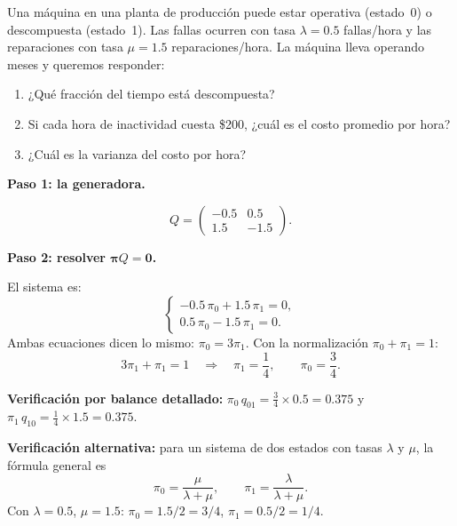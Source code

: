 \documentclass[11pt,a4paper]{article}
\theoremstyle{definition}
\theoremstyle{remark}
\begin{document}
\begin{ejemplo}
Una máquina en una planta de producción puede estar operativa (estado~0)
o descompuesta (estado~1).  Las fallas ocurren con tasa
$\lambda = 0.5$ fallas/hora y las reparaciones con tasa
$\mu = 1.5$ reparaciones/hora.  La máquina lleva operando meses y
queremos responder:

\begin{enumerate}[label=(\alph*)]
  \item ¿Qué fracción del tiempo está descompuesta?
  \item Si cada hora de inactividad cuesta \$200, ¿cuál es el costo
        promedio por hora?
  \item ¿Cuál es la varianza del costo por hora?
\end{enumerate}

\tcblower

\textbf{Paso 1: la generadora.}

\begin{center}
\end{center}

\[
  Q = \begin{pmatrix} -0.5 & 0.5 \\ 1.5 & -1.5 \end{pmatrix}.
\]

\textbf{Paso 2: resolver $\boldsymbol{\pi}Q = \boldsymbol{0}$.}

El sistema es:
\[
  \begin{cases}
    -0.5\,\pi_0 + 1.5\,\pi_1 = 0, \\
    0.5\,\pi_0 - 1.5\,\pi_1 = 0.
  \end{cases}
\]
Ambas ecuaciones dicen lo mismo: $\pi_0 = 3\pi_1$.  Con la normalización
$\pi_0 + \pi_1 = 1$:
\[
  3\pi_1 + \pi_1 = 1 \quad\Longrightarrow\quad \pi_1 = \frac{1}{4},
  \qquad \pi_0 = \frac{3}{4}.
\]

\textbf{Verificación por balance detallado:}
$\pi_0\,q_{01} = \frac{3}{4}\times 0.5 = 0.375$ y
$\pi_1\,q_{10} = \frac{1}{4}\times 1.5 = 0.375$. \checkmark

\textbf{Verificación alternativa:} para un sistema de dos estados con
tasas $\lambda$ y $\mu$, la fórmula general es
\[
  \pi_0 = \frac{\mu}{\lambda+\mu}, \qquad
  \pi_1 = \frac{\lambda}{\lambda+\mu}.
\]
Con $\lambda=0.5$, $\mu=1.5$: $\pi_0 = 1.5/2 = 3/4$,
$\pi_1 = 0.5/2 = 1/4$. \checkmark


\end{ejemplo}
\end{document}
